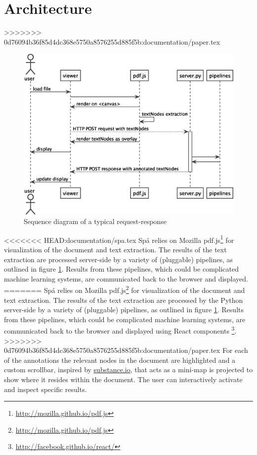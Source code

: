 \documentclass[runningheads,a4paper]{llncs}
\begin{document}
\section{Architecture}
\label{sec-2}
>>>>>>> 0d76094b36f85d4dc368e5750a8576255d885f5b:documentation/paper.tex
\begin{figure}[htb]
\centering
\includegraphics[width=.9\linewidth]{./diagrams//sequence.eps}
\caption{\label{fig:sequence}Sequence diagram of a typical request-response}
\end{figure}

<<<<<<< HEAD:documentation/spa.tex
Sp{\'a} relies on Mozilla pdf.js\footnote{\url{http://mozilla.github.io/pdf.js}} for visualization of the document and text extraction.
The results of the text extraction are processed server-side by a variety of (pluggable) pipelines, as outlined in figure \ref{fig:sequence}.
Results from these pipelines, which could be complicated machine learning systems, are communicated back to the browser and displayed.
=======
Spá relies on Mozilla pdf.js\footnote{\url{http://mozilla.github.io/pdf.js}} for visualization of the document and text extraction.
The results of the text extraction are processed by the Python server-side by a variety of (pluggable) pipelines, as outlined in figure \ref{fig:sequence}.
Results from these pipelines, which could be complicated machine learning systems, are communicated back to the browser and displayed using React components \footnote{\url{http://facebook.github.io/react/}}.
>>>>>>> 0d76094b36f85d4dc368e5750a8576255d885f5b:documentation/paper.tex
For each of the annotations the relevant nodes in the document are highlighted and a custom scrollbar, inspired by \href{http://substance.io/}{substance.io}, that acts as a mini-map is projected to show where it resides within the document.
The user can interactively activate and inspect specific results.
\end{document}

